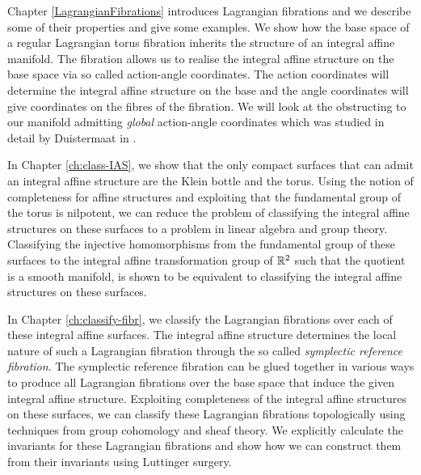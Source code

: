 Chapter \ref{LagrangianFibrations} introduces Lagrangian fibrations and we
describe some of their properties and give some examples. We show how the base
space of a regular Lagrangian torus fibration inherits the structure of an
integral affine manifold. The fibration allows us to realise the integral
affine structure on the base space via so called action-angle coordinates. The
action coordinates will determine the integral affine structure on the base and
the angle coordinates will give coordinates on the fibres of the fibration. We
will look at the obstructing to our manifold admitting \emph{global}
action-angle coordinates which was studied in detail by Duistermaat in
\cite{ActionAngle}.

In Chapter \ref{ch:class-IAS}, we show that the only compact surfaces that can
admit an integral affine structure are the Klein bottle and the torus. Using
the notion of completeness for affine structures and exploiting that the
fundamental group of the torus is nilpotent, we can reduce the problem of
classifying the integral affine structures on these surfaces to a problem in
linear algebra and group theory. Classifying the injective homomorphisms from
the fundamental group of these surfaces to the integral affine transformation
group of $\mathbb{R}^2$ such that the quotient is a smooth manifold, is shown to be
equivalent to classifying the integral affine structures on these surfaces.

In Chapter \ref{ch:classify-fibr}, we classify the Lagrangian fibrations over
each of these integral affine surfaces. The integral affine structure
determines the local nature of such a Lagrangian fibration through the so
called \emph{symplectic reference fibration}. The symplectic reference
fibration can be glued together in various ways to produce all Lagrangian
fibrations over the base space that induce the given integral affine structure.
Exploiting completeness of the integral affine structures on these surfaces, we
can classify these Lagrangian fibrations topologically using techniques from
group cohomology and sheaf theory. We explicitly calculate the invariants for
these Lagrangian fibrations and show how we can construct them from their
invariants using Luttinger surgery.


